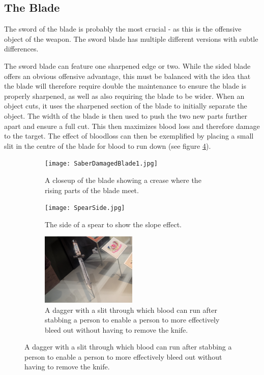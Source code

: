 \documentclass{article}
\begin{document}
\subsection{The Blade}

The sword of the blade is probably the most crucial - as this is the offensive object of the weapon. The sword blade has multiple different versions with subtle differences.

The sword blade can feature one sharpened edge or two. While the sided blade offers an obvious offensive advantage, this must be balanced with the idea that the blade will therefore require double the maintenance to ensure the blade is properly sharpened, as well as also requiring the blade to be wider. When an object cuts, it uses the sharpened section of the blade to initially separate the object. The width of the blade is then used to push the two new parts further apart and ensure a full cut. This then maximizes blood loss and therefore damage to the target. The effect of bloodloss can then be exemplified by placing a small slit in the centre of the blade for blood to run down (see figure \ref{fig:swordSlit}). 

\begin{figure}[h]
    \centering
    \caption{}
    \begin{subfigure}{0.49\textwidth}
        \texttt{[image: SaberDamagedBlade1.jpg]}
        \caption{A closeup of the blade showing a crease where the rising parts of the blade meet.}
        \label{fig:SwordCrease}
    \end{subfigure}
    \begin{subfigure}{0.49\textwidth}
        \texttt{[image: SpearSide.jpg]}
        \caption{The side of a spear to show the slope effect.}
        \label{fig:SpearSide}
    \end{subfigure}
    \begin{subfigure}{\textwidth}
        \centering
        \includegraphics[width=0.5\textwidth]{Dagger2.jpg}
        \caption{A dagger with a slit through which blood can run after stabbing a person to enable a person to more effectively bleed out without having to remove the knife.}
        \label{fig:swordSlit}
    \end{subfigure}
\end{figure}
\end{document}
